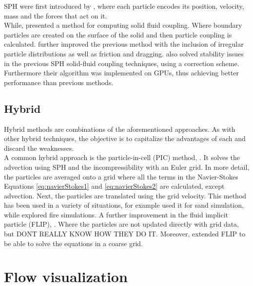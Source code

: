 SPH were first introduced by \cite{DesbrunMathieuandGascuel1996}, where each particle encodes its position, velocity, mass and the forces that act on it.\\

While, \cite{Muller2004} presented a method for computing solid fluid coupling. Where boundary particles are created on the surface of the solid and then particle coupling is calculated.
\cite{Akinci2012} further improved the previous method with the inclusion of irregular particle distributions as well as friction and dragging. 
\cite{Shao2014} also solved stability issues in the previous SPH solid-fluid coupling techniques, using a correction scheme.
Furthermore their algorithm was implemented on GPUs, thus achieving better performance than previous methods.  

\subsection{Hybrid}

Hybrid methods are combinations of the aforementioned approaches.
As with other hybrid techniques, the objective is to capitalize the advantages of each and discard the weaknesses.\\

A common hybrid approach is the particle-in-cell (PIC) method, \cite{Harlow1962}.
It solves the advection using SPH and the incompressibility with an Euler grid.
In more detail, the particles are averaged onto a grid where all the terms in the Navier-Stokes Equations \ref{eq:navierStokes1} and \ref{eq:navierStokes2} are calculated, except advection.
Next, the particles are translated using the grid velocity.
This method has been used in a variety of situations, for example \cite{Zhu2005} used it for sand simulation, while \cite{Horvath2009} explored fire simulations.
A further improvement in the fluid implicit particle (FLIP), \cite{J.U.Brackbill1986}.
Where the particles are not updated directly with grid data, but 
DONT REALLY KNOW HOW THEY DO IT.
Moreover, \cite{Raveendran2011} extended FLIP to be able to solve the equations in a coarse grid. 

\section{Flow visualization}


